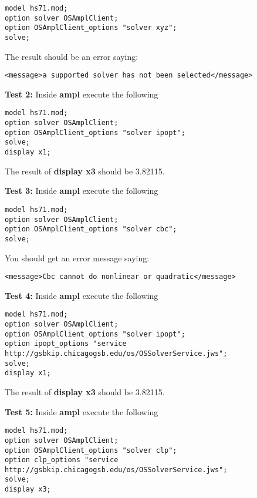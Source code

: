 \documentclass[11pt]{article}
\begin{document}
\begin{itemize}
\begin{itemize}
\begin{verbatim}
model hs71.mod;
option solver OSAmplClient;
option OSAmplClient_options "solver xyz";
solve;
\end{verbatim}

The result should be an error saying:
\begin{verbatim}
<message>a supported solver has not been selected</message>
\end{verbatim}
 
 \vskip 10pt
 
 {\bf Test 2:}  Inside  {\bf ampl} execute the following
 


\begin{verbatim}
model hs71.mod;
option solver OSAmplClient;
option OSAmplClient_options "solver ipopt";
solve;
display x1;
\end{verbatim}

The result of {\bf display x3} should be 3.82115. 


 \vskip 10pt
 
 {\bf Test 3:}  Inside  {\bf ampl} execute the following
 


\begin{verbatim}
model hs71.mod;
option solver OSAmplClient;
option OSAmplClient_options "solver cbc";
solve;
\end{verbatim}

You should get an error message saying:
\begin{verbatim}
<message>Cbc cannot do nonlinear or quadratic</message>
\end{verbatim}


\vskip 10pt

{\small
{\bf Test 4:}  Inside  {\bf ampl} execute the following
\begin{verbatim}
model hs71.mod;
option solver OSAmplClient;
option OSAmplClient_options "solver ipopt";
option ipopt_options "service http://gsbkip.chicagogsb.edu/os/OSSolverService.jws";
solve;
display x1;
\end{verbatim}
}%

The result of {\bf display x3} should be 3.82115. 


\vskip 10pt

{\small
{\bf Test 5:}  Inside  {\bf ampl} execute the following
\begin{verbatim}
model hs71.mod;
option solver OSAmplClient;
option OSAmplClient_options "solver clp";
option clp_options "service http://gsbkip.chicagogsb.edu/os/OSSolverService.jws";
solve;
display x3;
\end{verbatim}
}%


\end{itemize}
\end{itemize}
\end{document}

